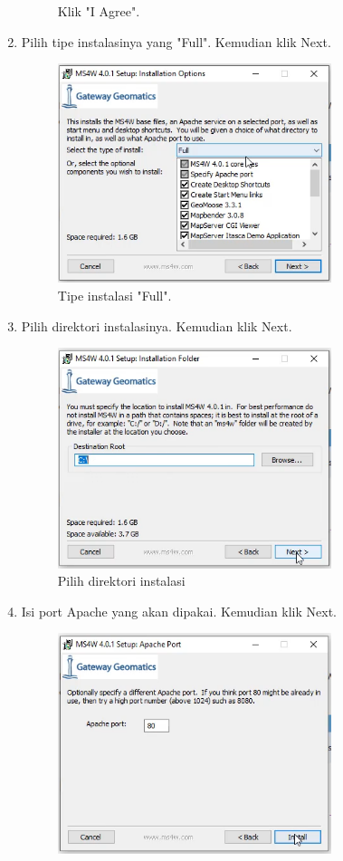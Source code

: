 \begin{enumerate}
\begin{figure}[H]
		\centering
		\caption{Klik "I Agree".}
	\end{figure}
	\item  Pilih tipe instalasinya yang "Full". Kemudian klik Next.
	\hfill\break
	\begin{figure}[H]
		\includegraphics[width=8cm]{figures/1174006/4/4.png}
		\centering
		\caption{Tipe instalasi "Full".}
	\end{figure}
	\item  Pilih direktori instalasinya. Kemudian klik Next.
	\hfill\break
	\begin{figure}[H]
		\includegraphics[width=8cm]{figures/1174006/4/5.png}
		\centering
		\caption{Pilih direktori instalasi}
	\end{figure}
	\item  Isi port Apache yang akan dipakai. Kemudian klik Next.
	\hfill\break
	\begin{figure}[H]
		\includegraphics[width=8cm]{figures/1174006/4/6.png}

\end{figure}
\end{enumerate}
